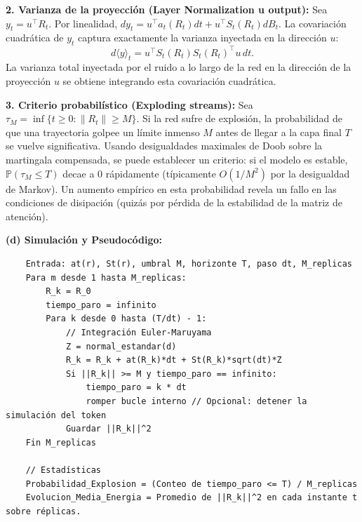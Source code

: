 \documentclass[11pt, letterpaper]{article}
\begin{document}
\begin{solucion}
    \textbf{2. Varianza de la proyección (Layer Normalization u output):}
    Sea $y_t = u^\top R_t$. Por linealidad, $dy_t = u^\top a_t(R_t) dt + u^\top S_t(R_t) dB_t$.
    La covariación cuadrática de $y_t$ captura exactamente la varianza inyectada en la dirección $u$:
    \[ d\langle y \rangle_t = u^\top S_t(R_t)S_t(R_t)^\top u \, dt. \]
    La varianza total inyectada por el ruido a lo largo de la red en la dirección de la proyección $u$ se obtiene integrando esta covariación cuadrática.

    \textbf{3. Criterio probabilístico (Exploding streams):}
    Sea $\tau_M = \inf\{t \ge 0 : \|R_t\| \ge M\}$. 
    Si la red sufre de explosión, la probabilidad de que una trayectoria golpee un límite inmenso $M$ antes de llegar a la capa final $T$ se vuelve significativa.
    Usando desigualdades maximales de Doob sobre la martingala compensada, se puede establecer un criterio: si el modelo es estable, $\mathbb{P}(\tau_M \le T)$ decae a 0 rápidamente (típicamente $O(1/M^2)$ por la desigualdad de Markov). Un aumento empírico en esta probabilidad revela un fallo en las condiciones de disipación (quizás por pérdida de la estabilidad de la matriz de atención).

    \textbf{(d) Simulación y Pseudocódigo:}
    \begin{verbatim}
    Entrada: at(r), St(r), umbral M, horizonte T, paso dt, M_replicas
    Para m desde 1 hasta M_replicas:
        R_k = R_0
        tiempo_paro = infinito
        Para k desde 0 hasta (T/dt) - 1:
            // Integración Euler-Maruyama
            Z = normal_estandar(d)
            R_k = R_k + at(R_k)*dt + St(R_k)*sqrt(dt)*Z
            Si ||R_k|| >= M y tiempo_paro == infinito:
                tiempo_paro = k * dt
                romper bucle interno // Opcional: detener la simulación del token
            Guardar ||R_k||^2
    Fin M_replicas
    
    // Estadísticas
    Probabilidad_Explosion = (Conteo de tiempo_paro <= T) / M_replicas
    Evolucion_Media_Energia = Promedio de ||R_k||^2 en cada instante t sobre réplicas.
    \end{verbatim}
\end{solucion}

\newpage
\end{document}
